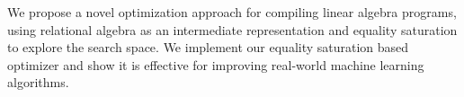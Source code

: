 
We propose a novel optimization approach for compiling linear algebra programs,
using relational algebra as an intermediate representation and equality
saturation to explore the search space. We implement our equality saturation
based optimizer and show it is effective for improving real-world machine
learning algorithms.

